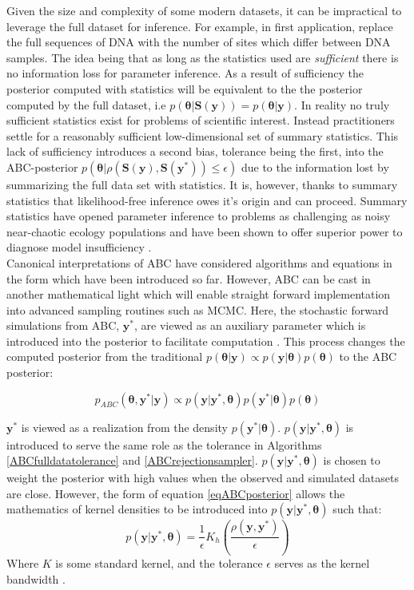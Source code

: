 Given the size and complexity of some modern datasets, it can be impractical to leverage the full dataset for inference. For example, in first application, \citet{Tavare1997} replace the full sequences of DNA with the number of sites which differ between DNA samples. The idea being that as long as the statistics used are \textit{sufficient} there is no information loss for parameter inference. As a result of sufficiency the posterior computed with statistics will be equivalent to the the posterior computed by the full dataset, i.e $p(\bm{\theta}|\bm{S}(\bm{y})) = p(\bm{\theta}|\bm{y})$. In reality no truly sufficient statistics exist for problems of scientific interest. Instead practitioners settle for a reasonably sufficient low-dimensional set of summary statistics. This lack of sufficiency introduces a second bias, tolerance being the first, into the ABC-posterior $p(\bm{\theta}|\rho(\bm{S}(\bm{y}),\bm{S}(\bm{y^*}))\leq\epsilon)$ due to the information lost by summarizing the full data set with statistics. It is, however, thanks to summary statistics that likelihood-free inference owes it's origin and can proceed. Summary statistics have opened parameter inference to problems as challenging as noisy near-chaotic ecology populations \citep{Wood2010} and have been shown to offer superior power to diagnose model insufficiency \citep{Ratmann2009,vrugt2013toward}.\\

Canonical interpretations of ABC have considered algorithms and equations in the form which have been introduced so far. However, ABC can be cast in another mathematical light which will enable straight forward implementation into advanced sampling routines such as MCMC. Here, the stochastic forward simulations from ABC, $\bm{y^*}$, are viewed as an auxiliary parameter which is introduced into the posterior to facilitate computation \citep{Sisson2010a}. This process changes the computed posterior from the traditional $p(\bm{\theta}|\bm{y}) \propto p(\bm{y}|\bm{\theta})p(\bm{\theta})$ to the ABC posterior:

\begin{equation}
p_{ABC}(\bm{\theta},\bm{y^*}|\bm{y}) \propto p(\bm{y}|\bm{y^*},\bm{\theta}) p(\bm{y^*}|\bm{\theta}) p(\bm{\theta})
\label{eqABCposterior}
\end{equation}

$\bm{y^*}$ is viewed as a realization from the density $p(\bm{y^*}|\bm{\theta})$. $p(\bm{y}|\bm{y^*},\bm{\theta})$ is introduced to serve the same role as the tolerance in Algorithms \ref{ABCfulldatatolerance} and \ref{ABCrejectionsampler}. $p(\bm{y}|\bm{y^*},\bm{\theta})$ is chosen to weight the posterior with high values when the observed and simulated datasets are close. However, the form of equation \ref{eqABCposterior} allows the mathematics of kernel densities to be introduced into $p(\bm{y}|\bm{y^*},\bm{\theta})$ such that:
\begin{equation}
p(\bm{y}|\bm{y^*},\bm{\theta}) = \frac{1}{\epsilon} K_h (\frac{\rho(\bm{y},\bm{y^*})}{\epsilon})
\end{equation}
Where $K$ is some standard kernel, and the tolerance $\epsilon$ serves as the kernel bandwidth . \\

